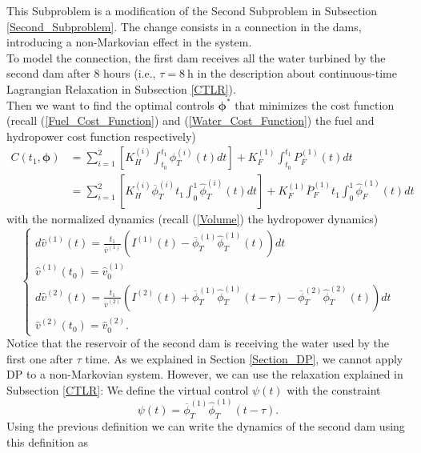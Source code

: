 This Subproblem is a modification of the Second Subproblem in Subsection \ref{Second_Subproblem}. The change consists in a connection in the dams, introducing a non-Markovian effect in the system.\\
To model the connection, the  first dam receives all the water turbined by the second dam after 8 hours (i.e., $\tau=\SI{8}{\hour}$ in the description about continuous-time Lagrangian Relaxation in Subsection \ref{CTLR}).\\
Then we want to find the optimal controls $\bm{\phi}^*$ that minimizes the cost function (recall (\ref{Fuel_Cost_Function}) and (\ref{Water_Cost_Function}) the fuel and hydropower cost function respectively)
\begin{equation}
\begin{split}
C(t_1,\bm{\phi})&=\sum_{i=1}^2\left[K_H^{(i)}\int_{t_0}^{t_1}\phi_T^{(i)}(t)dt\right]+K_F^{(1)}\int_{t_0}^{t_1}P_F^{(1)}(t)dt\\
&=\sum_{i=1}^2\left[K_H^{(i)}\overline{\phi}_T^{(i)}t_1\int_{0}^{1}\hat{\phi}_T^{(i)}(t)dt\right]+K_F^{(1)}\overline{P}_F^{(1)}t_1\int_{0}^{1}\hat{\phi}_F^{(1)}(t)dt
\end{split}
\end{equation}
with the normalized dynamics (recall (\ref{Volume}) the hydropower dynamics)
\begin{equation}
\begin{cases}
d\hat{v}^{(1)}(t)=\frac{t_1}{\overline{v}^{(1)}}\left(I^{(1)}(t)-\overline{\phi}_T^{(1)}\hat{\phi}_T^{(1)}(t)\right)dt\\
\hat{v}^{(1)}(t_0)=\hat{v}_0^{(1)}\\
d\hat{v}^{(2)}(t)=\frac{t_1}{\overline{v}^{(2)}}\left(I^{(2)}(t)+\overline{\phi}_T^{(1)}\hat{\phi}_T^{(1)}(t-\tau)-\overline{\phi}_T^{(2)}\hat{\phi}_T^{(2)}(t)\right)dt\\
\hat{v}^{(2)}(t_0)=\hat{v}_0^{(2)}.
\end{cases}
\label{Dynamics_Fourth_SP}
\end{equation}
Notice that the reservoir of the second dam is receiving the water used by the first one after $\tau$ time. As we explained in Section \ref{Section_DP}, we cannot apply DP to a non-Markovian system. However, we can use the relaxation explained in Subsection \ref{CTLR}: We define the virtual control $\psi(t)$ with the constraint
\begin{equation}
\psi(t)=\overline{\phi}_T^{(1)}\hat{\phi}_T^{(1)}(t-\tau).
\label{New_Constraint}
\end{equation}
Using the previous definition we can write the dynamics of the second dam using this definition as
